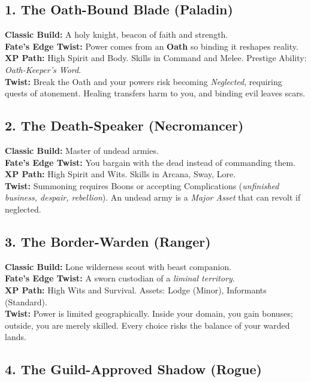 \documentclass[11pt]{article}
\begin{document}
\subsection{1. The Oath-Bound Blade (Paladin)}

\textbf{Classic Build:} A holy knight, beacon of faith and strength.\\
\textbf{Fate’s Edge Twist:} Power comes from an \textbf{Oath} so binding it
reshapes reality.\\
\textbf{XP Path:} High Spirit and Body. Skills in Command and Melee. Prestige
Ability: \emph{Oath-Keeper’s Word}.\\
\textbf{Twist:} Break the Oath and your powers risk becoming
\emph{Neglected}, requiring quests of atonement. Healing transfers harm to you,
and binding evil leaves scars.

\subsection{2. The Death-Speaker (Necromancer)}

\textbf{Classic Build:} Master of undead armies.\\
\textbf{Fate’s Edge Twist:} You bargain with the dead instead of commanding them.\\
\textbf{XP Path:} High Spirit and Wits. Skills in Arcana, Sway, Lore.\\
\textbf{Twist:} Summoning requires Boons or accepting Complications
(\emph{unfinished business, despair, rebellion}). An undead army is a
\emph{Major Asset} that can revolt if neglected.

\subsection{3. The Border-Warden (Ranger)}

\textbf{Classic Build:} Lone wilderness scout with beast companion.\\
\textbf{Fate’s Edge Twist:} A sworn custodian of a \emph{liminal territory}.\\
\textbf{XP Path:} High Wits and Survival. Assets: Lodge (Minor), Informants (Standard).\\
\textbf{Twist:} Power is limited geographically. Inside your domain, you gain
bonuses; outside, you are merely skilled. Every choice risks the balance of
your warded lands.

\subsection{4. The Guild-Approved Shadow (Rogue)}
\end{document}

